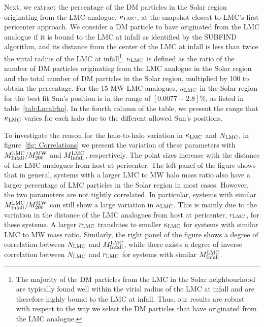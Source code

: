 Next, we extract the percentage of the DM particles in the Solar region originating from the LMC analogue, $\kappa_{\rm LMC}$, at the snapshot closest to LMC's first pericenter approach. We consider a DM particle to have originated from the LMC analogue if it is bound to the LMC at infall as identified by the SUBFIND algorithm, and its distance from the center of the LMC at infall is less than twice the virial radius of the LMC at infall\footnote{The  majority of the  DM particles from the LMC in the Solar neighbourhood are typically found 
well within the virial radius of the LMC at infall and are therefore highly bound to the LMC at infall. Thus, our results are robust with respect to  the way we select the DM particles that have originated from the LMC analogue.}. $\kappa_{\rm LMC}$ is defined as the ratio of the number of DM particles originating from the LMC analogue in the Solar region and the total number of DM particles in the Solar region, multiplied by 100 to obtain the percentage. For the 15 MW-LMC analogues, $\kappa_{\rm LMC}$ in the Solar region for the best fit Sun's position is in the range of $[0.0077-2.8]$\%, as listed in table~\ref{tab:Localrho}. 
In the fourth column of the table,  we present the range that $\kappa_{\rm LMC}$ varies for each halo due to the different allowed Sun's positions. 





To investigate the reason for the halo-to-halo variation in $\kappa_{\rm LMC}$ and $N_{\rm LMC}$, in figure~\ref{fig: Correlations} we present the variation of these parameters with $M_{\rm Infall}^{\rm LMC}/M_{200}^{\rm MW}$ and $M_{\rm Infall}^{\rm LMC}$, respectively. The point sizes increase with the distance of the LMC analogues from host at pericenter. The left panel of the figure shows that in general, systems with a larger LMC to MW halo mass ratio also have a larger percentage of LMC particles in the Solar region in most cases. However, the two parameters are not tightly correlated. In particular, systems with similar $M_{\rm Infall}^{\rm LMC}/M_{200}^{\rm MW}$ can still show a large variation in $\kappa_{\rm LMC}$. This is mainly due to the variation in the distance of the LMC analogues from host at pericenter, $r_{\rm LMC}$, for these systems. A larger $r_{\rm LMC}$ translates to smaller $\kappa_{\rm LMC}$ for systems with similar LMC to MW mass ratio. Similarly, the right panel of the figure shows a degree of correlation between $N_{\rm LMC}$ and $M_{\rm Infall}^{\rm LMC}$, while there exists a degree of inverse correlation between $N_{\rm LMC}$ and $r_{\rm LMC}$ for systems with similar $M_{\rm Infall}^{\rm LMC}$. 



